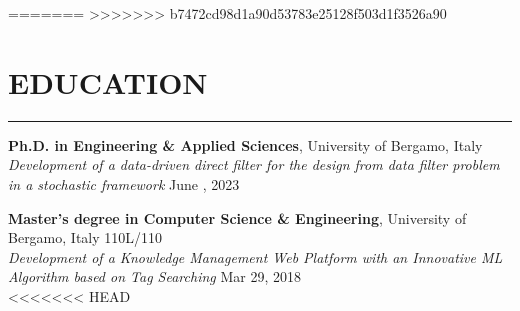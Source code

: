 \documentclass[10pt]{article}
\newcommand{\cvsection}[1]{\section*{\centering\normalsize\uppercase{#1}}\vspace{-16pt}\rule{\linewidth}{0.2pt}\vspace{6pt}}
\begin{document}
=======
>>>>>>> b7472cd98d1a90d53783e25128f503d1f3526a90
\cvsection{education}
\textbf{Ph.D. in Engineering \& Applied Sciences}, University of Bergamo, Italy\\
\textit{Development of a data-driven direct filter for the design from data filter problem in a stochastic framework} \hfill June , 2023\\

\vspace{-10pt}

\textbf{Master's degree in Computer Science \& Engineering}, University of Bergamo, Italy \hfill 110L\slash110\\
\textit{Development of a Knowledge Management Web Platform with an Innovative ML Algorithm based on Tag Searching} \hfill Mar 29, 2018\\

<<<<<<< HEAD
\vspace{-10pt}
\end{document}
